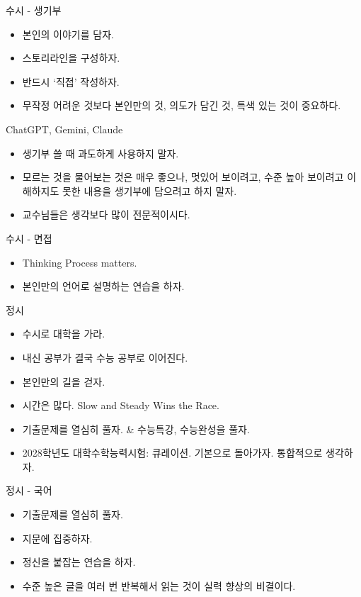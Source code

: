 \documentclass[12pt,aspectratio=169]{beamer}
\newenvironment{mainitemize}{\begin{itemize}\setlength{\itemsep}{0.72em}}{\end{itemize}}
\begin{document}
\begin{frame}{수시 - 생기부}
\begin{mainitemize}
  \item 본인의 이야기를 담자.
  \item 스토리라인을 구성하자.
  \item 반드시 ‘직접’ 작성하자.
  \item 무작정 어려운 것보다 본인만의 것, 의도가 담긴 것, 특색 있는 것이 중요하다.
\end{mainitemize}
\end{frame}

\begin{frame}{ChatGPT, Gemini, Claude}
\begin{mainitemize}
  \item 생기부 쓸 때 과도하게 사용하지 말자.
  \item 모르는 것을 물어보는 것은 매우 좋으나, 멋있어 보이려고, 수준 높아 보이려고 이해하지도 못한 내용을 생기부에 담으려고 하지 말자.
  \item 교수님들은 생각보다 많이 전문적이시다.
\end{mainitemize}
\end{frame}

\begin{frame}{수시 - 면접}
\begin{mainitemize}
  \item Thinking Process matters.
  \item 본인만의 언어로 설명하는 연습을 하자.
\end{mainitemize}
\end{frame}

\begin{frame}{정시}
\begin{mainitemize}
  \item 수시로 대학을 가라.
  \item 내신 공부가 결국 수능 공부로 이어진다.
  \item 본인만의 길을 걷자.
  \item 시간은 많다. Slow and Steady Wins the Race.
  \item 기출문제를 열심히 풀자. \& 수능특강, 수능완성을 풀자.
  \item 2028학년도 대학수학능력시험: 큐레이션. 기본으로 돌아가자. 통합적으로 생각하자.
\end{mainitemize}
\end{frame}

\begin{frame}{정시 - 국어}
\begin{mainitemize}
  \item 기출문제를 열심히 풀자.
  \item 지문에 집중하자.
  \item 정신을 붙잡는 연습을 하자.
  \item 수준 높은 글을 여러 번 반복해서 읽는 것이 실력 향상의 비결이다.
\end{mainitemize}
\end{frame}
\end{document}
